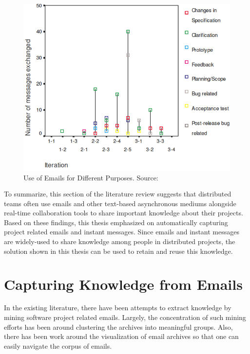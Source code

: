 \begin{figure}[h!]
	\centering
	\includegraphics[width=\textwidth]{Layman.png}
    \caption{Use of Emails for Different Purposes. Source: \cite{essential_communication}}
	\label{fig:layman}
\end{figure}

To summarize, this section of the literature review suggests that distributed teams often use emails and other text-based asynchronous mediums alongside real-time collaboration tools to share important knowledge about their projects. Based on these findings, this thesis emphasized on automatically capturing project related emails and instant messages. Since emails and instant messages are widely-used to share knowledge among people in distributed projects, the solution shown in this thesis can be used to retain and reuse this knowledge.

\section{Capturing Knowledge from Emails}
In the existing literature, there have been attempts to extract knowledge by mining software project related emails. Largely, the concentration of such mining efforts has been around clustering the archives into meaningful groups. Also, there has been work around the visualization of email archives so that one can easily navigate the corpus of emails.

